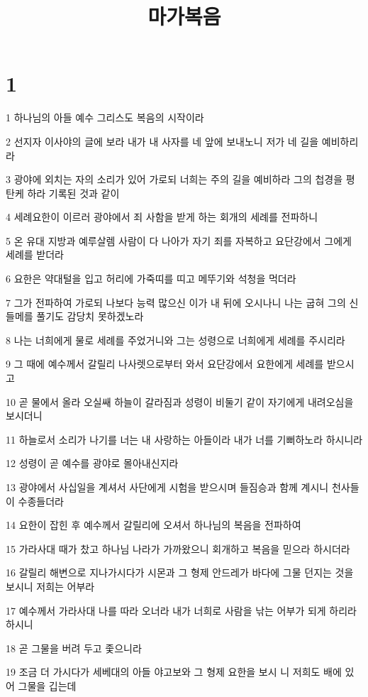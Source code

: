 

\title{마가복음}


\chapter{1}

\par 1 하나님의 아들 예수 그리스도 복음의 시작이라
\par 2 선지자 이사야의 글에 보라 내가 내 사자를 네 앞에 보내노니 저가 네 길을 예비하리라
\par 3 광야에 외치는 자의 소리가 있어 가로되 너희는 주의 길을 예비하라 그의 첩경을 평탄케 하라 기록된 것과 같이
\par 4 세례요한이 이르러 광야에서 죄 사함을 받게 하는 회개의 세례를 전파하니
\par 5 온 유대 지방과 예루살렘 사람이 다 나아가 자기 죄를 자복하고 요단강에서 그에게 세례를 받더라
\par 6 요한은 약대털을 입고 허리에 가죽띠를 띠고 메뚜기와 석청을 먹더라
\par 7 그가 전파하여 가로되 나보다 능력 많으신 이가 내 뒤에 오시나니 나는 굽혀 그의 신들메를 풀기도 감당치 못하겠노라
\par 8 나는 너희에게 물로 세례를 주었거니와 그는 성령으로 너희에게 세례를 주시리라
\par 9 그 때에 예수께서 갈릴리 나사렛으로부터 와서 요단강에서 요한에게 세례를 받으시고
\par 10 곧 물에서 올라 오실쌔 하늘이 갈라짐과 성령이 비둘기 같이 자기에게 내려오심을 보시더니
\par 11 하늘로서 소리가 나기를 너는 내 사랑하는 아들이라 내가 너를 기뻐하노라 하시니라
\par 12 성령이 곧 예수를 광야로 몰아내신지라
\par 13 광야에서 사십일을 계셔서 사단에게 시험을 받으시며 들짐승과 함께 계시니 천사들이 수종들더라
\par 14 요한이 잡힌 후 예수께서 갈릴리에 오셔서 하나님의 복음을 전파하여
\par 15 가라사대 때가 찼고 하나님 나라가 가까왔으니 회개하고 복음을 믿으라 하시더라
\par 16 갈릴리 해변으로 지나가시다가 시몬과 그 형제 안드레가 바다에 그물 던지는 것을 보시니 저희는 어부라
\par 17 예수께서 가라사대 나를 따라 오너라 내가 너희로 사람을 낚는 어부가 되게 하리라 하시니
\par 18 곧 그물을 버려 두고 좇으니라
\par 19 조금 더 가시다가 세베대의 아들 야고보와 그 형제 요한을 보시 니 저희도 배에 있어 그물을 깁는데
